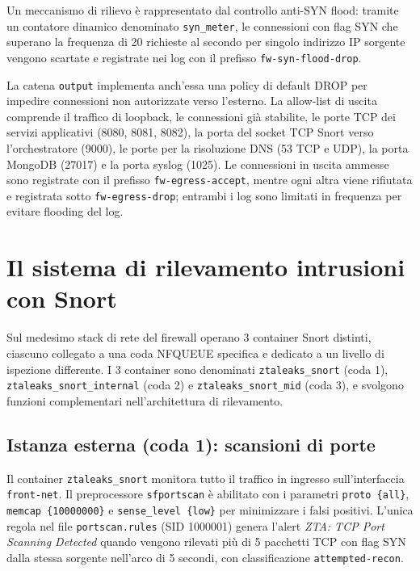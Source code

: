 Un meccanismo di rilievo è rappresentato dal controllo anti-SYN flood: tramite un contatore dinamico denominato \texttt{syn\_meter}, le connessioni con flag SYN che superano la frequenza di 20 richieste al secondo per singolo indirizzo IP sorgente vengono scartate e registrate nei log con il prefisso \texttt{fw-syn-flood-drop}.

La catena \texttt{output} implementa anch'essa una policy di default DROP per impedire connessioni non autorizzate verso l'esterno. La allow-list di uscita comprende il traffico di loopback, le connessioni già stabilite, le porte TCP dei servizi applicativi (8080, 8081, 8082), la porta del socket TCP Snort verso l'orchestratore (9000), le porte per la risoluzione DNS (53 TCP e UDP), la porta MongoDB (27017) e la porta syslog (1025). Le connessioni in uscita ammesse sono registrate con il prefisso \texttt{fw-egress-accept}, mentre ogni altra viene rifiutata e registrata sotto \texttt{fw-egress-drop}; entrambi i log sono limitati in frequenza per evitare flooding del log.

\section{Il sistema di rilevamento intrusioni con Snort}

Sul medesimo stack di rete del firewall operano 3 container Snort distinti, ciascuno collegato a una coda NFQUEUE specifica e dedicato a un livello di ispezione differente. I 3 container sono denominati \texttt{ztaleaks\_snort} (coda 1), \texttt{ztaleaks\_snort\_internal} (coda 2) e \texttt{ztaleaks\_snort\_mid} (coda 3), e svolgono funzioni complementari nell'architettura di rilevamento.

\subsection*{Istanza esterna (coda 1): scansioni di porte}

Il container \texttt{ztaleaks\_snort} monitora tutto il traffico in ingresso sull'interfaccia \texttt{front-net}. Il preprocessore \texttt{sfportscan} è abilitato con i parametri \texttt{proto \{all\}}, \texttt{memcap \{10000000\}} e \texttt{sense\_level \{low\}} per minimizzare i falsi positivi. L'unica regola nel file \texttt{portscan.rules} (SID 1000001) genera l'alert \textit{ZTA: TCP Port Scanning Detected} quando vengono rilevati più di 5 pacchetti TCP con flag SYN dalla stessa sorgente nell'arco di 5 secondi, con classificazione \texttt{attempted-recon}.

